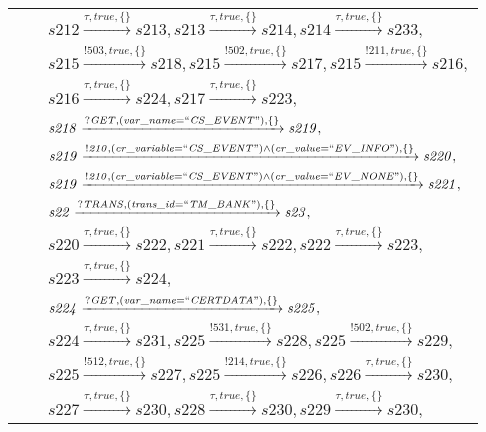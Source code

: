 \begin{tabular}{lcp{350px}}
& & $\mathit{s212}\xrightarrow{\mathit{\tau}, \mathit{true}, \{\}}\mathit{s213},\mathit{s213}\xrightarrow{\mathit{\tau}, \mathit{true}, \{\}}\mathit{s214},\mathit{s214}\xrightarrow{\mathit{\tau}, \mathit{true}, \{\}}\mathit{s233},$ \\
& & $\mathit{s215}\xrightarrow{\mathit{!503}, \mathit{true}, \{\}}\mathit{s218},\mathit{s215}\xrightarrow{\mathit{!502}, \mathit{true}, \{\}}\mathit{s217},\mathit{s215}\xrightarrow{\mathit{!211}, \mathit{true}, \{\}}\mathit{s216},$ \\
& & $\mathit{s216}\xrightarrow{\mathit{\tau}, \mathit{true}, \{\}}\mathit{s224},\mathit{s217}\xrightarrow{\mathit{\tau}, \mathit{true}, \{\}}\mathit{s223},$ \\
& & $\mathit{s218}\xrightarrow{\mathit{?GET}, \mathit{(var\_name = ``CS\_EVENT")}, \{\}}\mathit{s219},$ \\
& & $\mathit{s219}\xrightarrow{\mathit{!210}, \mathit{(cr\_variable = ``CS\_EVENT") \land (cr\_value = ``EV\_INFO")}, \{\}}\mathit{s220},$ \\
& & $\mathit{s219}\xrightarrow{\mathit{!210}, \mathit{(cr\_variable = ``CS\_EVENT") \land (cr\_value = ``EV\_NONE")}, \{\}}\mathit{s221},$ \\
& & $\mathit{s22}\xrightarrow{\mathit{?TRANS}, \mathit{(trans\_id = ``TM\_BANK")}, \{\}}\mathit{s23},$ \\
& & $\mathit{s220}\xrightarrow{\mathit{\tau}, \mathit{true}, \{\}}\mathit{s222},\mathit{s221}\xrightarrow{\mathit{\tau}, \mathit{true}, \{\}}\mathit{s222},\mathit{s222}\xrightarrow{\mathit{\tau}, \mathit{true}, \{\}}\mathit{s223},$ \\
& & $\mathit{s223}\xrightarrow{\mathit{\tau}, \mathit{true}, \{\}}\mathit{s224},$ \\
& & $\mathit{s224}\xrightarrow{\mathit{?GET}, \mathit{(var\_name = ``CERTDATA")}, \{\}}\mathit{s225},$ \\
& & $\mathit{s224}\xrightarrow{\mathit{\tau}, \mathit{true}, \{\}}\mathit{s231},\mathit{s225}\xrightarrow{\mathit{!531}, \mathit{true}, \{\}}\mathit{s228},\mathit{s225}\xrightarrow{\mathit{!502}, \mathit{true}, \{\}}\mathit{s229},$ \\
& & $\mathit{s225}\xrightarrow{\mathit{!512}, \mathit{true}, \{\}}\mathit{s227},\mathit{s225}\xrightarrow{\mathit{!214}, \mathit{true}, \{\}}\mathit{s226},\mathit{s226}\xrightarrow{\mathit{\tau}, \mathit{true}, \{\}}\mathit{s230},$ \\
& & $\mathit{s227}\xrightarrow{\mathit{\tau}, \mathit{true}, \{\}}\mathit{s230},\mathit{s228}\xrightarrow{\mathit{\tau}, \mathit{true}, \{\}}\mathit{s230},\mathit{s229}\xrightarrow{\mathit{\tau}, \mathit{true}, \{\}}\mathit{s230},$ \\

\end{tabular}

